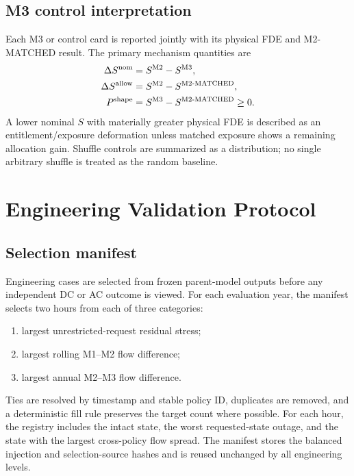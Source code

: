\documentclass[10pt,journal,onecolumn]{IEEEtran}
\newcommand{\Mtwo}{\ensuremath{\mathrm{M2}}}
\newcommand{\Mthree}{\ensuremath{\mathrm{M3}}}
\newcommand{\MtwoMatched}{\ensuremath{\mathrm{M2\text{-}MATCHED}}}
\begin{document}
\subsection{M3 control interpretation}

Each M3 or control card is reported jointly with its physical FDE and
M2-MATCHED result. The primary mechanism quantities are
\begin{align}
\Delta S^{\mathrm{nom}}
&=S^{\Mtwo}-S^{\Mthree},
\notag\\
\Delta S^{\mathrm{allow}}
&=S^{\Mtwo}-S^{\MtwoMatched},
\notag\\
P^{\mathrm{shape}}
&=S^{\Mthree}-S^{\MtwoMatched}\geq0.
\end{align}
A lower nominal $S$ with materially greater physical FDE is described as an
entitlement/exposure deformation unless matched exposure shows a remaining
allocation gain. Shuffle controls are summarized as a distribution; no single
arbitrary shuffle is treated as the random baseline.

\section{Engineering Validation Protocol}
\label{sec:report_engineering}

\subsection{Selection manifest}

Engineering cases are selected from frozen parent-model outputs before any
independent DC or AC outcome is viewed. For each evaluation year, the manifest
selects two hours from each of three categories:
\begin{enumerate}[leftmargin=*,itemsep=2pt]
\item largest unrestricted-request residual stress;
\item largest rolling M1--M2 flow difference;
\item largest annual M2--M3 flow difference.
\end{enumerate}
Ties are resolved by timestamp and stable policy ID, duplicates are removed, and
a deterministic fill rule preserves the target count where possible. For each
hour, the registry includes the intact state, the worst requested-state outage,
and the state with the largest cross-policy flow spread. The manifest stores the
balanced injection and selection-source hashes and is reused unchanged by all
engineering levels.
\end{document}
